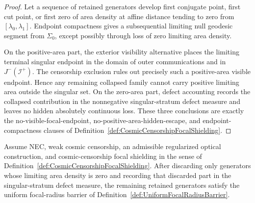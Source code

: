 \begin{proof}
Let a sequence of retained generators develop first conjugate point, first cut point, or first zero of area density at affine distance tending to zero from $[\lambda_0,\lambda_1]$. Endpoint compactness gives a subsequential limiting null geodesic segment from $\Sigma_0$, except possibly through loss of zero limiting area density.

On the positive-area part, the exterior visibility alternative places the limiting terminal singular endpoint in the domain of outer communications and in $J^-(\mathscr I^+)$. The censorship exclusion rules out precisely such a positive-area visible endpoint. Hence any remaining collapsed family cannot carry positive limiting area outside the singular set. On the zero-area part, defect accounting records the collapsed contribution in the nonnegative singular-stratum defect measure and leaves no hidden absolutely continuous loss. These three conclusions are exactly the no-visible-focal-endpoint, no-positive-area-hidden-escape, and endpoint-compactness clauses of Definition~\ref{def:CosmicCensorshipFocalShielding}.
\end{proof}

\begin{theorem}\label{thm:FocalShieldingUniformBarrier}
Assume NEC, weak cosmic censorship, an admissible regularized optical construction, and cosmic-censorship focal shielding in the sense of Definition~\ref{def:CosmicCensorshipFocalShielding}. After discarding only generators whose limiting area density is zero and recording that discarded part in the singular-stratum defect measure, the remaining retained generators satisfy the uniform focal-radius barrier of Definition~\ref{def:UniformFocalRadiusBarrier}.
\end{theorem}

